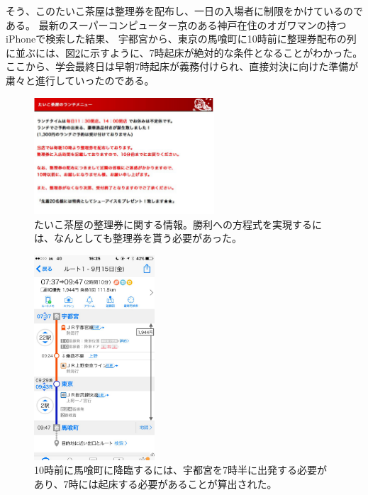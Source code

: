 そう、このたいこ茶屋は整理券を配布し、一日の入場者に制限をかけているのである。
最新のスーパーコンピューター京のある神戸在住のオガワマンの持つiPhoneで検索した結果、
宇都宮から、東京の馬喰町に10時前に整理券配布の列に並ぶには、図\ref{fig:UmakuichoDensya}に示すように、7時起床が絶対的な条件となることがわかった。
ここから、学会最終日は早朝7時起床が義務付けられ、直接対決に向けた準備が粛々と進行していったのである。


\begin{figure}[htbp]
  \begin{center}
    \includegraphics[width=0.6\textwidth]{./section/sasakiLIVE/figures/SeiriKen.png}
  \end{center}
  \caption{たいこ茶屋の整理券に関する情報。勝利への方程式を実現するには、なんとしても整理券を貰う必要があった。}
  \label{fig:SeiriKen}
\end{figure}

\begin{figure}[htbp]
  \begin{center}
    \includegraphics[width=0.4\textwidth]{./section/sasakiLIVE/figures/UmakuichoDensya.png}
  \end{center}
  \caption{10時前に馬喰町に降臨するには、宇都宮を7時半に出発する必要があり、7時には起床する必要があることが算出された。}
  \label{fig:UmakuichoDensya}
\end{figure}


